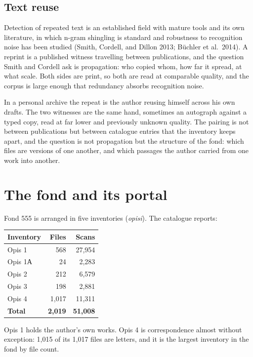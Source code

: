 \documentclass[11pt,a4paper]{article}
\begin{document}
\subsection{Text reuse}\label{text-reuse}

Detection of repeated text is an established field with mature tools and its
own literature, in which n-gram shingling is standard and robustness to
recognition noise has been studied (Smith, Cordell, and Dillon 2013; Büchler
et al.~2014). A reprint is a published witness travelling between
publications, and the question Smith and Cordell ask is propagation: who
copied whom, how far it spread, at what scale. Both sides are print, so both
are read at comparable quality, and the corpus is large enough that redundancy
absorbs recognition noise.

In a personal archive the repeat is the author reusing himself across his own
drafts. The two witnesses are the same hand, sometimes an autograph against a
typed copy, read at far lower and previously unknown quality. The pairing is
not between publications but between catalogue entries that the inventory
keeps apart, and the question is not propagation but the structure of the
fond: which files are versions of one another, and which passages the author
carried from one work into another.

\section{The fond and its portal}\label{the-fond-and-its-portal}

Fond 555 is arranged in five inventories (\emph{opisi}). The catalogue reports:

\begin{longtable}[]{@{}lrr@{}}
\toprule\noalign{}
Inventory & Files & Scans \\
\midrule\noalign{}
\endhead
\bottomrule\noalign{}
\endlastfoot
Opis 1 & 568 & 27,954 \\
Opis 1А & 24 & 2,283 \\
Opis 2 & 212 & 6,579 \\
Opis 3 & 198 & 2,881 \\
Opis 4 & 1,017 & 11,311 \\
\textbf{Total} & \textbf{2,019} & \textbf{51,008} \\
\end{longtable}

Opis 1 holds the author's own works. Opis 4 is correspondence almost without
exception: 1,015 of its 1,017 files are letters, and it is the largest
inventory in the fond by file count.
\end{document}
